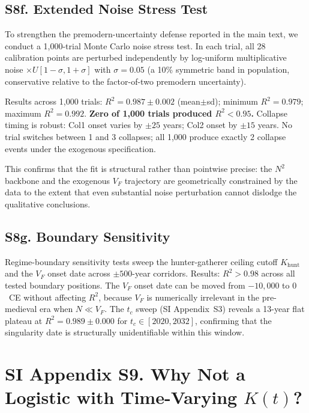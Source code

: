 \documentclass[11pt]{article}
\begin{document}
\subsection*{S8f. Extended Noise Stress Test}

To strengthen the premodern-uncertainty defense reported in the main text, we conduct a 1,000-trial Monte Carlo noise stress test. In each trial, all 28 calibration points are perturbed independently by log-uniform multiplicative noise $\times U[1-\sigma,1+\sigma]$ with $\sigma=0.05$ (a 10\% symmetric band in population, conservative relative to the factor-of-two premodern uncertainty).

Results across 1,000 trials:
$R^2=0.987\pm 0.002$ (mean$\pm$sd); minimum $R^2=0.979$; maximum $R^2=0.992$.
\textbf{Zero of 1,000 trials produced $R^2<0.95$.}
Collapse timing is robust: Col1 onset varies by $\pm 25$ years; Col2 onset by $\pm 15$ years. No trial switches between 1 and 3 collapses; all 1,000 produce exactly 2 collapse events under the exogenous specification.

This confirms that the fit is structural rather than pointwise precise: the $N^2$ backbone and the exogenous $V_F$ trajectory are geometrically constrained by the data to the extent that even substantial noise perturbation cannot dislodge the qualitative conclusions.

\subsection*{S8g. Boundary Sensitivity}

Regime-boundary sensitivity tests sweep the hunter-gatherer ceiling cutoff $K_{\mathrm{hunt}}$ and the $V_F$ onset date across $\pm 500$-year corridors. Results: $R^2>0.98$ across all tested boundary positions. The $V_F$ onset date can be moved from $-10{,}000$ to $0$~CE without affecting $R^2$, because $V_F$ is numerically irrelevant in the pre-medieval era when $N\ll V_F$. The $t_c$ sweep (SI Appendix~S3) reveals a 13-year flat plateau at $R^2=0.989\pm 0.000$ for $t_c\in[2020,2032]$, confirming that the singularity date is structurally unidentifiable within this window.

\pagebreak

\section*{SI Appendix S9. Why Not a Logistic with Time-Varying $K(t)$?}
\label{sec:S9_logistic}
\end{document}

